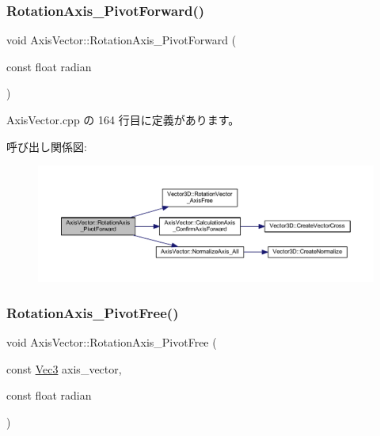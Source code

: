 \subsubsection{\texorpdfstring{Rotation\+Axis\+\_\+\+Pivot\+Forward()}{RotationAxis\_PivotForward()}}
{\footnotesize\ttfamily void Axis\+Vector\+::\+Rotation\+Axis\+\_\+\+Pivot\+Forward (\begin{DoxyParamCaption}\item[{const float}]{radian }\end{DoxyParamCaption})}



 Axis\+Vector.\+cpp の 164 行目に定義があります。

呼び出し関係図\+:
\nopagebreak
\begin{figure}[H]
\begin{center}
\leavevmode
\includegraphics[width=350pt]{class_axis_vector_a42872a62f656e7249af84e39fd519475_cgraph}
\end{center}
\end{figure}
\mbox{\label{class_axis_vector_a7cab74dd54bf4fc97770aee2278f2fa4}} 
\subsubsection{\texorpdfstring{Rotation\+Axis\+\_\+\+Pivot\+Free()}{RotationAxis\_PivotFree()}}
{\footnotesize\ttfamily void Axis\+Vector\+::\+Rotation\+Axis\+\_\+\+Pivot\+Free (\begin{DoxyParamCaption}\item[{const \mbox{\hyperlink{_vector3_d_8h_ab16f59e4393f29a01ec8b9bbbabbe65d}{Vec3}}}]{axis\+\_\+vector,  }\item[{const float}]{radian }\end{DoxyParamCaption})}



